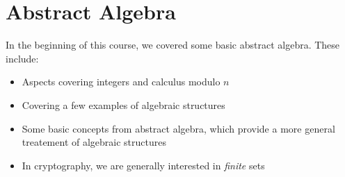 \section{Abstract Algebra}\label{sec:Abstract_Algebra}
In the beginning of this course, we covered some basic abstract algebra.
These include:
\begin{itemize}[noitemsep]
\item Aspects covering integers and calculus modulo $n$
\item Covering a few examples of algebraic structures
\item Some basic concepts from abstract algebra, which provide a more general treatement of algebraic structures
\item In cryptography, we are generally interested in \emph{finite} sets
\end{itemize}











